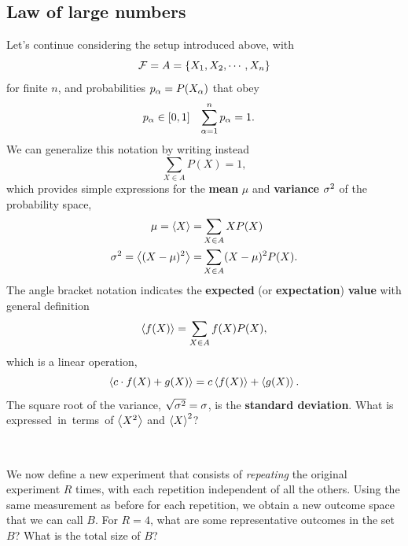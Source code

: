 \subsection{\label{sec:LLN}Law of large numbers}
Let's continue considering the setup introduced above, with
\begin{equation}
  \label{eq:finite_set}
  \mathcal F = A = \left\{X_1, X_2, \cdots, X_n\right\}
\end{equation}
for finite $n$, and probabilities $p_{\alpha} = P(X_{\alpha})$ that obey
\begin{align*}
  p_{\alpha} & \in [0, 1] &
  \sum_{\alpha = 1}^n p_{\alpha} & = 1.
\end{align*}
We can generalize this notation by writing instead
\begin{equation*}
  \sum_{X \in A} P(X) = 1,
\end{equation*}
which provides simple expressions for the \textbf{mean} $\mu$ and \textbf{variance} $\sigma^2$ of the probability space,
\begin{align}
              \mu = \left\langle X \right\rangle = & \sum_{X \in A} X P(X)            \label{eq:mean} \\
  \sigma^2 = \left\langle (X - \mu)^2 \right\rangle = & \sum_{X \in A} (X - \mu)^2 P(X). \label{eq:var}
\end{align}
The angle bracket notation indicates the \textbf{expected} (or \textbf{expectation}) \textbf{value} with general definition
\begin{equation}
  \label{eq:expect_disc}
  \left\langle f(X) \right\rangle = \sum_{X \in A} f(X) P(X),
\end{equation}
which is a linear operation,
\begin{equation*}
  \left\langle c\cdot f(X) + g(X) \right\rangle = c\left\langle f(X) \right\rangle + \left\langle g(X) \right\rangle.
\end{equation*}
\newpage %
\noindent The square root of the variance, $\sqrt{\sigma^2} = \sigma$, is the \textbf{standard deviation}.
What is \si expressed in terms of $\left\langle X^2 \right\rangle$ and $\left\langle X \right\rangle^2$?
\begin{mdframed}
  \ \\[100 pt]
\end{mdframed}

We now define a new experiment that consists of \textit{repeating} the original experiment $R$ times, with each repetition independent of all the others.
Using the same measurement as before for each repetition, we obtain a new outcome space that we can call $B$.
For $R = 4$, what are some representative outcomes in the set $B$?
What is the total size of $B$?
\begin{mdframed}
  \ \\[100 pt]
\end{mdframed}

